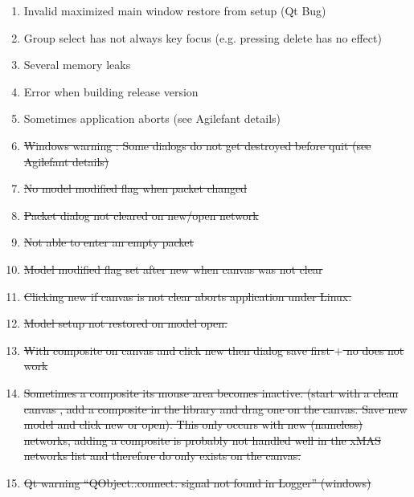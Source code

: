 \begin{enumerate} \label{sec:bug-list}
\item	Invalid maximized main window restore from setup (Qt Bug)
\item	Group select has not always key focus (e.g. pressing delete has no effect)
\item	Several memory leaks
\item	Error when building release version
\item	Sometimes application aborts (see Agilefant details)
\item \st{Windows warning : Some dialogs do not get destroyed before quit (see Agilefant details)}
\item	\st{No model modified flag when packet changed}
\item	\st{Packet dialog not cleared on new/open network}
\item \st{Not able to enter an empty packet}
\item	\st{Model modified flag set after new when canvas was not clear}
\item	\st{Clicking new if canvas is not clear aborts application under Linux.}
\item	\st{Model setup not restored on model open.}
\item \st{With composite on canvas and click new then dialog save first $+$ no does not
work}
\item \st{Sometimes a composite its mouse area becomes inactive. (start with a clean
canvas , add a composite in the library and drag one on the canvas. Save new
model and click new or open). This only occurs with new (nameless) networks,
adding a composite is probably not handled well in the xMAS networks list and
therefore do only exists on the canvas.}
\item \st{Qt warning ``QObject::connect: signal not found in Logger'' (windows)}
\end{enumerate}

